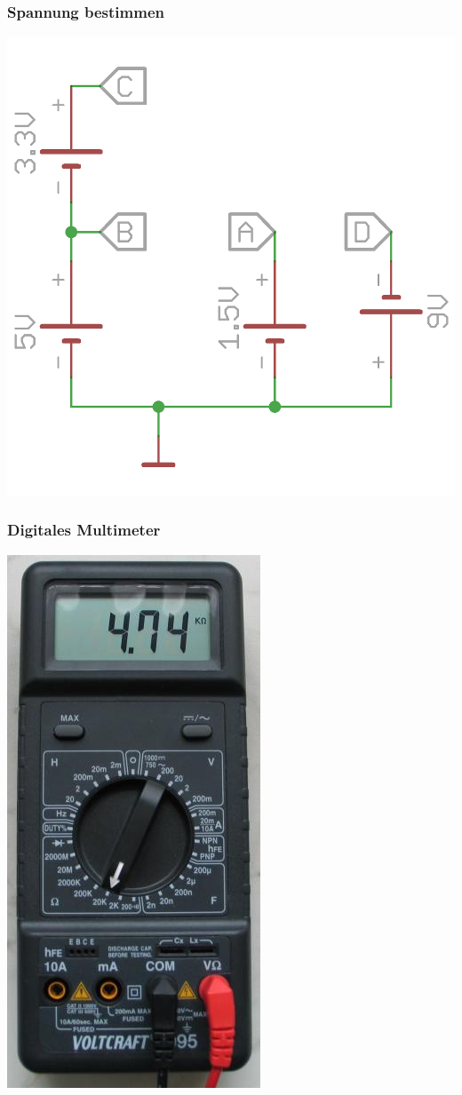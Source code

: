 \begin{frame}
    \frametitle{Spannung bestimmen}
    \begin{center}
        \includegraphics[width=.85\textwidth]{e02/Spannung.png}
	\end{center}
\end{frame}

\begin{frame}
    \frametitle{Digitales Multimeter}
    \begin{center}
        \includegraphics[width=.35\textwidth]{e02/digitalmultimeter.jpg}
	\end{center}
\end{frame}

